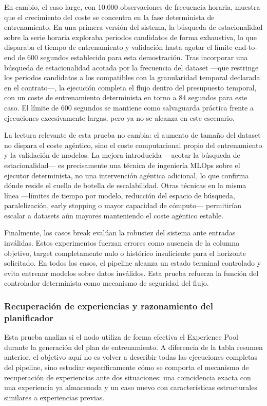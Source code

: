 \documentclass[12pt,a4paper]{article}
\theoremstyle{plain}
\begin{document}
En cambio, el caso large, con 10.000 observaciones de frecuencia horaria, muestra que el crecimiento del coste se concentra en la fase determinista de entrenamiento. En una primera versión del sistema, la búsqueda de estacionalidad sobre la serie horaria exploraba periodos candidatos de forma exhaustiva, lo que disparaba el tiempo de entrenamiento y validación hasta agotar el límite end-to-end de 600 segundos establecido para esta demostración. Tras incorporar una búsqueda de estacionalidad acotada por la frecuencia del dataset ---que restringe los periodos candidatos a los compatibles con la granularidad temporal declarada en el contrato---, la ejecución completa el flujo dentro del presupuesto temporal, con un coste de entrenamiento determinista en torno a 84 segundos para este caso. El límite de 600 segundos se mantiene como salvaguarda práctica frente a ejecuciones excesivamente largas, pero ya no se alcanza en este escenario.

La lectura relevante de esta prueba no cambia: el aumento de tamaño del dataset no dispara el coste agéntico, sino el coste computacional propio del entrenamiento y la validación de modelos. La mejora introducida ---acotar la búsqueda de estacionalidad--- es precisamente una técnica de ingeniería MLOps sobre el ejecutor determinista, no una intervención agéntica adicional, lo que confirma dónde reside el cuello de botella de escalabilidad. Otras técnicas en la misma línea ---límites de tiempo por modelo, reducción del espacio de búsqueda, paralelización, early stopping o mayor capacidad de cómputo--- permitirían escalar a datasets aún mayores manteniendo el coste agéntico estable.

Finalmente, los casos break evalúan la robustez del sistema ante entradas inválidas. Estos experimentos fuerzan errores como ausencia de la columna objetivo, target completamente nulo o histórico insuficiente para el horizonte solicitado. En todos los casos, el pipeline alcanza un estado terminal controlado y evita entrenar modelos sobre datos inválidos. Esta prueba refuerza la función del controlador determinista como mecanismo de seguridad del flujo.

\subsubsection{Recuperación de experiencias y razonamiento del planificador}
\label{sec:caso-retrieval}

Esta prueba analiza si el nodo  utiliza de forma efectiva el Experience Pool durante la generación del plan de entrenamiento. A diferencia de la tabla resumen anterior, el objetivo aquí no es volver a describir todas las ejecuciones completas del pipeline, sino estudiar específicamente cómo se comporta el mecanismo de recuperación de experiencias ante dos situaciones: una coincidencia exacta con una experiencia ya almacenada y un caso nuevo con características estructurales similares a experiencias previas.
\end{document}
